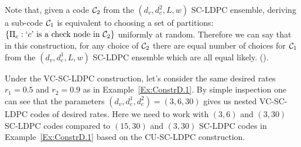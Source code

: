 \documentclass[journal,draftcls,onecolumn,12pt,twoside]{IEEEtran}
\begin{document}
\begin{Remark}\label{Rmk:EquivNestedConstr2}
Note that, given a code $\mathcal{C}_{2}$ from the $(d_{v},d_{c}^{2},L,w)$ SC-LDPC ensemble, deriving a sub-code $\mathcal{C}_{1}$ is equivalent to choosing a set of partitions: $\{\Pi_{c}: \text{`}c\text{' is a check node in } \mathcal{C}_{2}\}$ uniformly at random. Therefore we can say that in this construction, for any choice of $\mathcal{C}_{2}$ there are equal number of choices for $\mathcal{C}_{1}$ from the $(d_{v},d_{c}^{1},L,w)$ SC-LDPC ensemble which are all equal likely. ({\color{red}{I use this fact later in one of the proofs, but not sure about where to place this remark}}).
\end{Remark}


\begin{Example}\label{Ex:ConstrD.2}
Under the VC-SC-LDPC construction, let's consider the same desired rates $r_{1}=0.5$ and $r_{2}=0.9$ as in Example~\ref{Ex:ConstrD.1}. By simple inspection one can see that the parameters $(d_{v},d_{c}^{1},d_{c}^{2})=(3,6,30)$ gives us nested VC-SC-LDPC codes of desired rates. Here we need to work with $(3,6)$ and $(3,30)$ SC-LDPC codes compared to $(15,30)$ and $(3,30)$ SC-LDPC codes in Example~\ref{Ex:ConstrD.1} based on the CU-SC-LDPC construction.
\end{Example}
\end{document}
